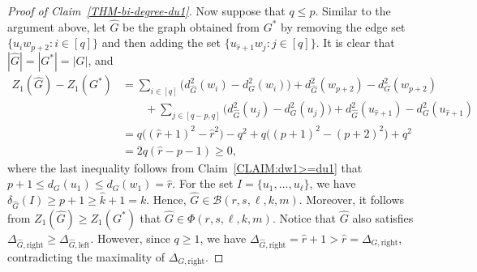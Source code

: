 \documentclass[10pt,a4paper]{amsart}
\begin{document}
\begin{proof}[Proof of Claim~\ref{THM-bi-degree-du1}]
        Now suppose that $q \le p$. 
        Similar to the argument above, let $\hat{G}$ be the graph obtained from $G^{\ast}$ by removing the edge set $\{u_i w_{p+2} \colon i \in [q]\}$ and then adding the set $\{u_{\hat{r}+1} w_j \colon j \in [q]\}$. 
        It is clear that $|\hat{G}| = |G^{\ast}| = |G|$, and 
        \begin{align*}
            Z_{1}(\hat{G}) - Z_{1}(G^{\ast})
            & = \sum_{i \in [q]} \big( d_{\hat{G}}^{2}(w_i) - d_{G}^{2}(w_i) \big) + d_{\hat{G}}^{2}(w_{p+2}) - d_{G}^{2}(w_{p+2}) \\
            & \qquad + \sum_{j \in [q-p, q]} \big( d_{\hat{G}}^{2}(u_j) - d_{G}^{2}(u_j) \big) + d_{\hat{G}}^{2}(u_{\hat{r}+1}) - d_{G}^{2}(u_{\hat{r}+1}) \\
            & = q \big( (\hat{r}+1)^2 - \hat{r}^2 \big) - q^2 + q \big( (p+1)^2 - (p+2)^2 \big) + q^2 \\
            & = 2q(\hat{r} - p-1) 
            \ge 0, 
        \end{align*}
        where the last inequality follows from Claim~\ref{CLAIM:dw1>=du1} that $p+1 \le d_{G}(u_1) \le d_{G}(w_1) = \hat{r}$. 
        For the set $I = \{u_1, \ldots,u_{\ell}\}$, we have $\delta_{\hat{G}}(I) \ge p+1 \ge \hat{k}+1 =k$. 
        Hence, $\hat{G} \in \mathcal{B}(r,s,\ell,k,m)$. 
        Moreover, it follows from $Z_{1}(\hat{G}) \ge Z_{1}(G^{\ast})$ that $\hat{G} \in \Phi(r,s,\ell,k,m)$. 
        Notice that $\hat{G}$ also satisfies $\Delta_{\hat{G}, \mathrm{right}} \ge \Delta_{\hat{G}, \mathrm{left}}$. 
        However, since $q \ge 1$, we have $\Delta_{\hat{G},\mathrm{right}} = \hat{r} + 1 > \hat{r} = \Delta_{G,\mathrm{right}}$, contradicting the maximality of $\Delta_{G,\mathrm{right}}$.  
    \end{proof}%
\end{document}
